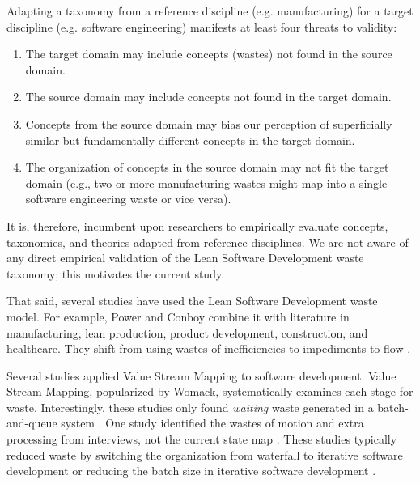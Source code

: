 Adapting a taxonomy from a reference discipline (e.g. manufacturing) for a target discipline (e.g. software engineering) manifests at least four threats to validity: 
\begin{enumerate}
  \item The target domain may include concepts (wastes) not found in the source domain. 
  \item The source domain may include concepts not found in the target domain.
  \item Concepts from the source domain may bias our perception of superficially similar but fundamentally different concepts in the target domain.
  \item The organization of concepts in the source domain may not fit the target domain (e.g., two or more manufacturing wastes might map into a single software engineering waste or vice versa). 
\end{enumerate}
It is, therefore, incumbent upon researchers to empirically evaluate concepts, taxonomies, and theories adapted from reference disciplines. We are not aware of any direct empirical validation of the Lean Software Development waste taxonomy; this motivates the current study. 

That said, several studies have used the Lean Software Development waste model. For example, Power and Conboy combine it with literature in manufacturing, lean production, product development, construction, and healthcare. They shift from using wastes of inefficiencies to impediments to flow \cite{PowerImpediments}.


Several studies applied Value Stream Mapping to software development. Value Stream Mapping, popularized by Womack, systematically examines each stage for waste. Interestingly, these studies only found \textit{waiting} waste generated in a batch-and-queue system \cite{Ali2016, Khurum2014, Mujtaba2010}. One study identified the wastes of motion and extra processing from interviews, not the current state map \cite{Mujtaba2010}. These studies typically reduced waste by switching the organization from waterfall to iterative software development or reducing the batch size in iterative software development \cite{Ali2016, Khurum2014, Mujtaba2010}.

